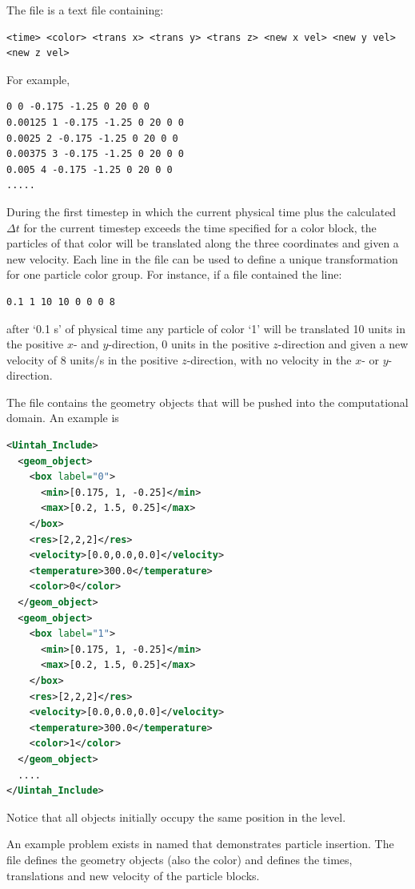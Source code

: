 The  file is a text file containing:
\begin{lstlisting}[backgroundcolor=\color{background}]
<time> <color> <trans x> <trans y> <trans z> <new x vel> <new y vel> <new z vel>
\end{lstlisting}  
For example,
\begin{lstlisting}[backgroundcolor=\color{background}]
0 0 -0.175 -1.25 0 20 0 0
0.00125 1 -0.175 -1.25 0 20 0 0
0.0025 2 -0.175 -1.25 0 20 0 0
0.00375 3 -0.175 -1.25 0 20 0 0
0.005 4 -0.175 -1.25 0 20 0 0
.....
\end{lstlisting}  

During the first timestep in which the current physical time plus the calculated 
$\Delta t$ for the current timestep exceeds the time specified for a color block, the 
particles of that color will be translated along the three coordinates and given 
a new velocity.  Each line in the file can be used to define a unique transformation
for one particle color group.  For instance, if a file contained the line:
\begin{lstlisting}[backgroundcolor=\color{background}]
0.1 1 10 10 0 0 0 8 
\end{lstlisting}
\noindent after `0.1 s' of physical time any particle of color `1' will be translated 10 
units in the positive $x$- and $y$-direction, 0 units in the positive $z$-direction 
and given a new velocity of 8 units/s in the positive $z$-direction, with no 
velocity in the $x$- or $y$-direction.

The  file contains the geometry objects that
will be pushed into the computational domain.  An example is
\begin{lstlisting}[language=XML]
<Uintah_Include>
  <geom_object>
    <box label="0">
      <min>[0.175, 1, -0.25]</min>
      <max>[0.2, 1.5, 0.25]</max>
    </box>
    <res>[2,2,2]</res>
    <velocity>[0.0,0.0,0.0]</velocity>
    <temperature>300.0</temperature>
    <color>0</color>
  </geom_object>
  <geom_object>
    <box label="1">
      <min>[0.175, 1, -0.25]</min>
      <max>[0.2, 1.5, 0.25]</max>
    </box>
    <res>[2,2,2]</res>
    <velocity>[0.0,0.0,0.0]</velocity>
    <temperature>300.0</temperature>
    <color>1</color>
  </geom_object>
  ....
</Uintah_Include>
\end{lstlisting}
Notice that all objects initially occupy the same position in the  level.

An example problem exists in  named 
 that demonstrates particle insertion. The 
 file defines the geometry objects (also the color) and
 defines the times, translations and new velocity of the 
particle blocks.  

